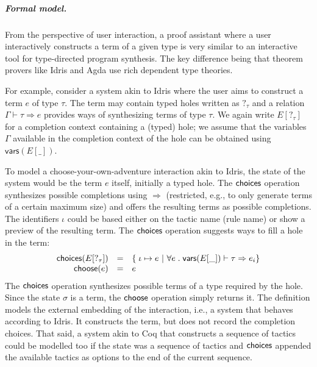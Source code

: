 \documentclass[a4paper,UKenglish,cleveref, autoref, thm-restate]{lipics-v2021}
\newcommand{\ident}[1]{\textsf{#1}}
\newcommand{\select}{\textnormal{\ident{choose}}}
\newcommand{\choices}{\textnormal{\ident{choices}}}
\begin{document}
\subparagraph{Formal model.}
From the perspective of user interaction, a proof assistant where a user interactively constructs
a term of a given type is very similar to an interactive tool for type-directed program synthesis.
The key difference being that theorem provers like Idris and Agda use rich dependent type theories.

For example, consider a system akin to Idris where the user aims to construct a term $e$ of type
$\tau$. The term may contain typed holes written as $?_\tau$ and a relation $\Gamma\vdash \tau\Rightarrow e$
provides ways of synthesizing terms of type $\tau$. We again write $E[?_\tau]$ for a
completion context containing a (typed) hole; we assume that the variables $\Gamma$ available in
the completion context of the hole can be obtained using $\ident{vars}(E[\_])$.

To model a choose-your-own-adventure interaction akin to Idris, the state of the system
would be the term $e$ itself, initially a typed hole. The $\choices$ operation synthesizes
possible completions using $\Rightarrow$ (restricted, e.g., to only generate terms of a certain
maximum size) and offers the resulting terms as possible completions. The identifiers $\iota$
could be based either on the tactic name (rule name) or show a preview of the resulting term.
The $\choices$ operation suggests ways to fill a hole in the term:
\[
\begin{array}{rcl}
\choices(E[?_\tau]) &=& \{\; \iota \mapsto e ~|~ \forall e\;.\; \ident{vars}(E[\_]) \vdash \tau \Rightarrow e_i \}\\
\select(e) &=& e
\end{array}
\]
The $\choices$ operation synthesizes possible terms of a type required by the hole. Since the
state $\sigma$ is a term, the $\select$ operation simply returns it. The definition models the
external embedding of the interaction, i.e., a system that behaves according to Idris. It
constructs the term, but does not record the completion choices. That said, a system akin to Coq
that constructs a sequence of tactics could be modelled too if the state was a sequence of
tactics and $\choices$ appended the available tactics as options to the end of the current sequence.
\end{document}
